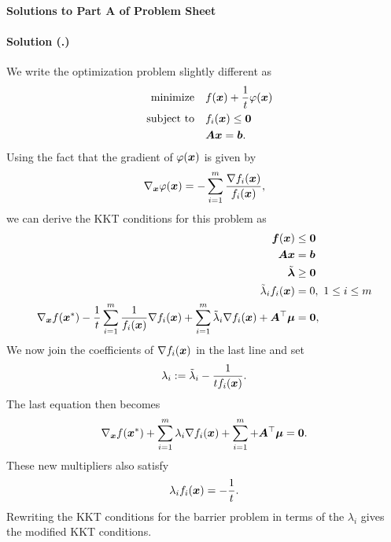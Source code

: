 \documentclass{article}
\newcounter{problemSheetNumber}
\newcounter{problems}
\renewcommand{\solution}[1]{\paragraph{Solution (\theproblemSheetNumber.\theproblems)}\addtocounter{problems}{1}\label{#1}}
\begin{document}
 
\begin{center}
{\Large {\bf Solutions to Part A of Problem Sheet \theproblemSheetNumber}}
\end{center}

\solution{pr:1} We write the optimization problem slightly different as
\begin{align*}
 \text{minimize}\quad & f(\bm{x})+\frac{1}{t}\varphi(\bm{x})\\
 \quad\text{subject to}\quad & f_i(\bm{x})\leq \bm{0}\\
 & \bm{A}\bm{x}=\bm{b}.
\end{align*}
Using the fact that the gradient of $\varphi(\bm{x})$ is given by
\begin{equation*}
  \nabla_{\bm{x}}\varphi(\bm{x}) = -\sum_{i=1}^m \frac{\nabla f_i(\bm{x})}{f_i(\bm{x})},
\end{equation*}
we can derive the KKT conditions for this problem as
\begin{align*}
\begin{split}
  \bm{f}(\bm{x}) & \leq \bm{0}\\
  \bm{A}\bm{x} & = \bm{b}\\
  \tilde{\bm{\lambda}}&\geq \bm{0}\\
  \tilde{\lambda}_if_i(\bm{x}) & = 0, \ 1\leq i\leq m\\
  \nabla_{\bm{x}} f(\bm{x}^*)-\frac{1}{t}\sum_{i=1}^m \frac{1}{f_i(\bm{x})}\nabla f_i(\bm{x})+\sum_{i=1}^m \tilde{\lambda}_i \nabla f_i(\bm{x})+\bm{A}^{\top}\bm{\mu} &= \bm{0},
 \end{split}
 \end{align*}
 We now join the coefficients of $\nabla f_i(\bm{x})$ in the last line and set
 \begin{equation*}
  \lambda_i := \tilde{\lambda}_i-\frac{1}{tf_i(\bm{x})}.
 \end{equation*}
 The last equation then becomes
 \begin{equation*}
  \nabla_{\bm{x}} f(\bm{x}^*)+\sum_{i=1}^m \lambda_i\nabla f_i(\bm{x})+\sum_{i=1}^m +\bm{A}^{\top}\bm{\mu} = \bm{0}.
 \end{equation*}
These new multipliers also satisfy
\begin{equation*}
 \lambda_i f_i(\bm{x}) = -\frac{1}{t}.
\end{equation*}
Rewriting the KKT conditions for the barrier problem in terms of the $\lambda_i$ gives the modified KKT conditions.
\end{document}
